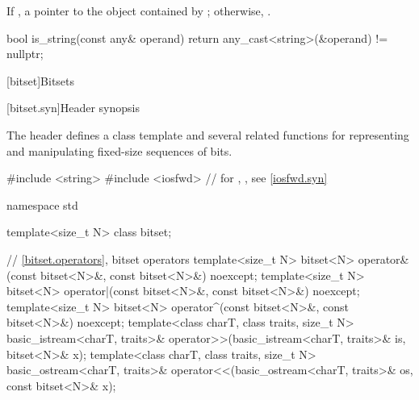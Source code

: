 \begin{itemdescr}
\pnum
\returns
If ,
a pointer to the object contained by ;
otherwise, .

\pnum
\begin{example}
\begin{codeblock}
bool is_string(const any& operand) {
  return any_cast<string>(&operand) != nullptr;
}
\end{codeblock}
\end{example}
\end{itemdescr}

[bitset]{Bitsets}
%

[bitset.syn]{Header  synopsis}%

\pnum
The header  defines a class template
and several related functions for representing
and manipulating fixed-size sequences of bits.

\begin{codeblock}
#include <string>
#include <iosfwd>   // for , , see \ref{iosfwd.syn}

namespace std {
  template<size_t N> class bitset;

  // \ref{bitset.operators}, bitset operators
  template<size_t N>
    bitset<N> operator&(const bitset<N>&, const bitset<N>&) noexcept;
  template<size_t N>
    bitset<N> operator|(const bitset<N>&, const bitset<N>&) noexcept;
  template<size_t N>
    bitset<N> operator^(const bitset<N>&, const bitset<N>&) noexcept;
  template<class charT, class traits, size_t N>
    basic_istream<charT, traits>&
      operator>>(basic_istream<charT, traits>& is, bitset<N>& x);
  template<class charT, class traits, size_t N>
    basic_ostream<charT, traits>&
      operator<<(basic_ostream<charT, traits>& os, const bitset<N>& x);
}
\end{codeblock}

